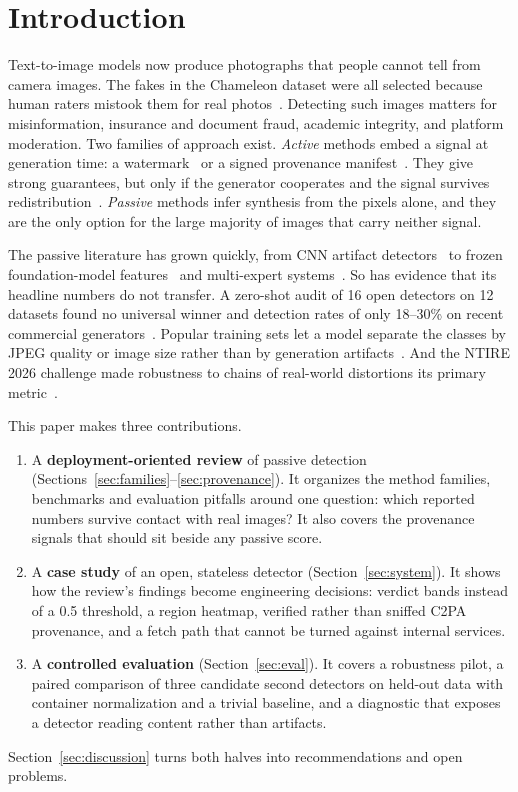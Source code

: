 \documentclass[conference]{IEEEtran}
\begin{document}
\section{Introduction}

Text-to-image models now produce photographs that people cannot tell from
camera images. The fakes in the Chameleon dataset were all selected because
human raters mistook them for real photos~\cite{yan2025aide}. Detecting such
images matters for misinformation, insurance and document fraud, academic
integrity, and platform moderation. Two families of approach exist. \emph{Active}
methods embed a signal at generation time: a watermark~\cite{wen2023treering,gowal2025synthid}
or a signed provenance manifest~\cite{c2pa2026spec}. They give strong
guarantees, but only if the generator cooperates and the signal survives
redistribution~\cite{guo2024passive}. \emph{Passive} methods infer synthesis
from the pixels alone, and they are the only option for the large majority
of images that carry neither signal.

The passive literature has grown quickly, from CNN artifact detectors~\cite{wang2020cnnspot}
to frozen foundation-model features~\cite{ojha2023univfd} and multi-expert
systems~\cite{yan2025aide}. So has evidence that its headline numbers do not
transfer. A zero-shot audit of 16 open detectors on 12 datasets found no
universal winner and detection rates of only 18--30\% on recent commercial
generators~\cite{ren2026outofbox}. Popular training sets let a model separate
the classes by JPEG quality or image size rather than by generation
artifacts~\cite{grommelt2024fakeorjpeg}. And the NTIRE 2026 challenge made
robustness to chains of real-world distortions its primary metric~\cite{ntire2026robust}.

This paper makes three contributions.
\begin{enumerate}
\item A \textbf{deployment-oriented review} of passive detection
  (Sections~\ref{sec:families}--\ref{sec:provenance}). It organizes the
  method families, benchmarks and evaluation pitfalls around one question:
  which reported numbers survive contact with real images? It also covers
  the provenance signals that should sit beside any passive score.
\item A \textbf{case study} of an open, stateless detector
  (Section~\ref{sec:system}). It shows how the review's findings become
  engineering decisions: verdict bands instead of a 0.5 threshold, a region
  heatmap, verified rather than sniffed C2PA provenance, and a fetch path
  that cannot be turned against internal services.
\item A \textbf{controlled evaluation} (Section~\ref{sec:eval}). It covers
  a robustness pilot, a paired comparison of three candidate second
  detectors on held-out data with container normalization and a trivial
  baseline, and a diagnostic that exposes a detector reading content
  rather than artifacts.
\end{enumerate}
Section~\ref{sec:discussion} turns both halves into recommendations and
open problems.
\end{document}
